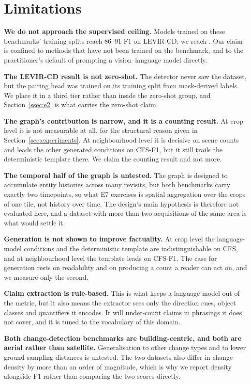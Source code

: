\section{Limitations}

\textbf{We do not approach the supervised ceiling.} Models trained on these
benchmarks' training splits reach 86--91 F1 on LEVIR-CD; we reach
\EOnePixelFOne. Our claim is confined to methods that have not been trained on
the benchmark, and to the practitioner's default of prompting a
vision--language model directly.

\textbf{The LEVIR-CD result is not zero-shot.} The detector never saw the
dataset, but the pairing head was trained on its training split from
mask-derived labels. We place it in a third tier rather than inside the
zero-shot group, and Section~\ref{ssec:e2} is what carries the zero-shot claim.

\textbf{The graph's contribution is narrow, and it is a counting result.} At
crop level it is not measurable at all, for the structural reason given in
Section~\ref{sec:experiments}. At neighbourhood level it is decisive on scene
counts and leads the other generated conditions on CFS-F1, but it still trails
the deterministic template there. We claim the counting result and not more.

\textbf{The temporal half of the graph is untested.} The graph is designed to
accumulate entity histories across many revisits, but both benchmarks carry
exactly two timepoints, so what E7 exercises is spatial aggregation over the
crops of one tile, not history over time. The design's main hypothesis is
therefore not evaluated here, and a dataset with more than two acquisitions of
the same area is what would settle it.

\textbf{Generation is not shown to improve factuality.} At crop level the
language-model conditions and the deterministic template are indistinguishable
on CFS, and at neighbourhood level the template leads on CFS-F1. The case for
generation rests on readability and on producing a count a reader can act on,
and we measure only the second.

\textbf{Claim extraction is rule-based.} This is what keeps a language model
out of the metric, but it also means the extractor sees only the direction
cues, object classes and quantifiers it encodes. It will under-count claims in
phrasings it does not cover, and it is tuned to the vocabulary of this domain.

\textbf{Both change-detection benchmarks are building-centric, and both are
aerial rather than satellite.} Generalisation to other change types and to
lower ground sampling distances is untested. The two datasets also differ in
change density by more than an order of magnitude, which is why we report
density alongside F1 rather than comparing the two scores directly.

